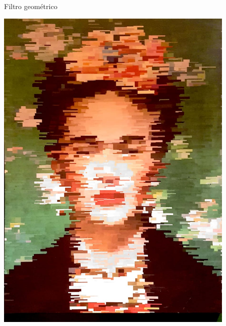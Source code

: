 \documentclass[
  ignorenonframetext,
]{beamer}
\begin{document}
\begin{frame}{Filtro geométrico}
\protect\hypertarget{filtro-geomuxe9trico}{}

\small

\includegraphics[width=4.5in]{IMAGENS/Frida}

\begin{center}
\tiny{}
\end{center}

\end{frame}
\end{document}

